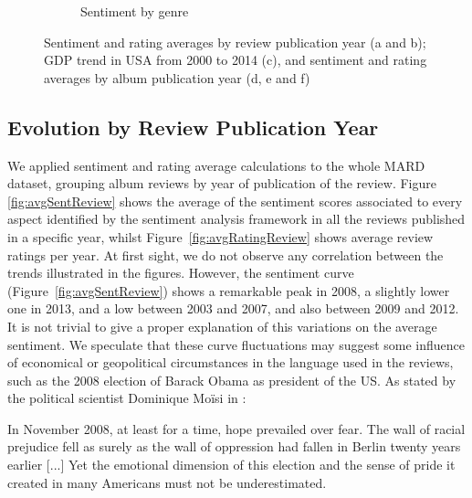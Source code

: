 \begin{figure}[ht!]
\begin{subfigure}{.3\textwidth}
        \caption{Sentiment by genre}
        \label{fig:avgSentimentGenresRelease}
    \end{subfigure}
    \caption{Sentiment and rating averages by review publication year (a and b); GDP trend in USA from 2000 to 2014 (c), and sentiment and rating averages by album publication year (d, e and f)}
\end{figure}

\subsection{Evolution by Review Publication Year}

We applied sentiment and rating average calculations to the whole MARD dataset, grouping album reviews by year of publication of the review. Figure \ref{fig:avgSentReview} shows the average of the sentiment scores associated to every aspect identified by the sentiment analysis framework in all the reviews published in a specific year, whilst Figure~\ref{fig:avgRatingReview} shows average review ratings per year. At first sight, we do not observe any correlation between the trends illustrated in the figures. However, the sentiment curve (Figure~\ref{fig:avgSentReview}) shows a remarkable peak in 2008, a slightly lower one in 2013, and a low between 2003 and 2007, and also between 2009 and 2012. %
It is not trivial to give a proper explanation of this variations on the average sentiment. We speculate that these curve fluctuations may suggest some influence of economical or geopolitical circumstances in the language used in the reviews, such as the 2008 election of Barack Obama as president of the US. As stated by the political scientist Dominique Mo\"{i}si in \cite{Moisi2010}:

\begin{displayquote}\small{
In November 2008, at least for a time, hope prevailed over fear. The wall of racial prejudice fell as surely as the wall of oppression had fallen in Berlin twenty years earlier [...] Yet the emotional dimension of this election and the sense of pride it created in many Americans must not be underestimated.}
\end{displayquote}

